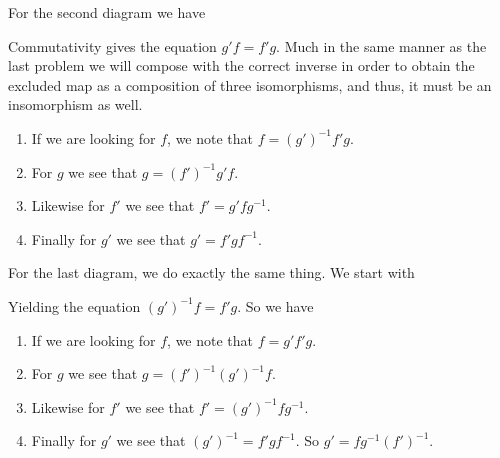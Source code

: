 \documentclass{article}
\begin{document}
\begin{solution}{\parindent}
  For the second diagram we have
  \begin{center}
  \end{center}
  Commutativity gives the equation $g'f = f'g$. Much in the same
  manner as the last problem we will compose with the correct inverse
  in order to obtain the excluded map as a composition of three
  isomorphisms, and thus, it must be an insomorphism as well.
  \begin{enumerate}
  \item If we are looking for $f$, we note that $f = (g')^{-1}f'g$.
  \item For $g$ we see that $g = (f')^{-1}g'f$.
  \item Likewise for $f'$ we see that $f' = g'fg^{-1}$.
  \item Finally for $g'$ we see that $g' = f'gf^{-1}$.
  \end{enumerate}
  For the last diagram, we do exactly the same thing. We start with
  \begin{center}
  \end{center}
  Yielding the equation $(g')^{-1}f = f'g$. So we have
  \begin{enumerate}
  \item If we are looking for $f$, we note that $f = g'f'g$.
  \item For $g$ we see that $g = (f')^{-1}(g')^{-1}f$.
  \item Likewise for $f'$ we see that $f' = (g')^{-1}fg^{-1}$.
  \item Finally for $g'$ we see that $(g')^{-1} = f'gf^{-1}$. So $g' =
    fg^{-1}(f')^{-1}$.
  \end{enumerate}
\end{solution}
\end{document}
